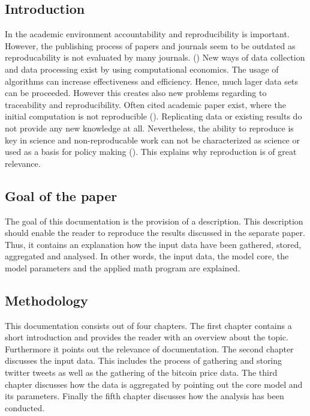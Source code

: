 \documentclass[a4paper,12pt]{article}
\begin{document}
\begin{spacing}{1.2}
\cleardoublepage{}
\section{Introduction}
In the academic environment accountability and reproducibility is important. However, the publishing process of papers and journals seem to be outdated as reproducability is not evaluated by many journals. (\cite{mccullough2013}) New ways of data collection and data processing exist by using computational economics. The usage of algorithms can increase effectiveness and efficiency. Hence, much lager data sets can be proceeded. However this creates also new problems regarding to traceability and reproducibility. Often cited academic paper exist, where the initial computation is not reproducible (\cite{mccullough2013}). Replicating data or existing results do not provide any new knowledge at all. Nevertheless, the ability to reproduce is key in science and non-reproducable work can not be characterized as science or used as a basis for policy making (\cite{mccullough2013}). This explains why reproduction is of great relevance.

\subsection{Goal of the paper}
The goal of this documentation is the provision of a description. This description should enable the reader to reproduce the results discussed in the separate paper. Thus, it contains an explanation how the input data have been gathered, stored, aggregated and analysed. In other words, the input data, the model core, the model parameters and the applied math program are explained.

\subsection{Methodology}
This documentation consists out of four chapters. The first chapter contains a short introduction and provides the reader with an overview about the topic. Furthermore it points out the relevance of documentation. The second chapter discusses the input data. This includes the process of gathering and storing twitter tweets as well as the gathering of the bitcoin price data. The third chapter discusses how the data is aggregated by pointing out the core model and its parameters. Finally the fifth chapter discusses how the analysis has been conducted.


\end{spacing}
\end{document}
